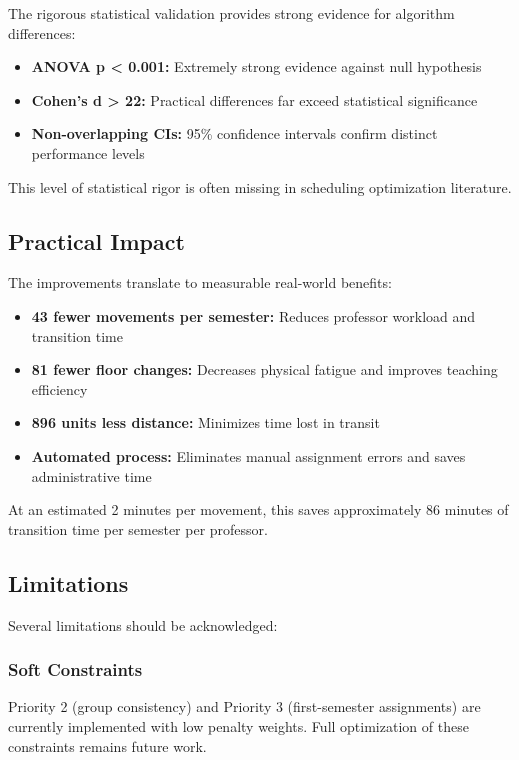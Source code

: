 \documentclass[algorithms,article,submit,pdftex,moreauthors]{Definitions/mdpi}
\begin{document}
The rigorous statistical validation provides strong evidence for algorithm differences:

\begin{itemize}
\item \textbf{ANOVA p < 0.001:} Extremely strong evidence against null hypothesis
\item \textbf{Cohen's d > 22:} Practical differences far exceed statistical significance
\item \textbf{Non-overlapping CIs:} 95\% confidence intervals confirm distinct performance levels
\end{itemize}

This level of statistical rigor is often missing in scheduling optimization literature.

\subsection{Practical Impact}

The improvements translate to measurable real-world benefits:

\begin{itemize}
\item \textbf{43 fewer movements per semester:} Reduces professor workload and transition time
\item \textbf{81 fewer floor changes:} Decreases physical fatigue and improves teaching efficiency
\item \textbf{896 units less distance:} Minimizes time lost in transit
\item \textbf{Automated process:} Eliminates manual assignment errors and saves administrative time
\end{itemize}

At an estimated 2 minutes per movement, this saves approximately 86 minutes of transition time per semester per professor.

\subsection{Limitations}

Several limitations should be acknowledged:

\subsubsection{Soft Constraints}

Priority 2 (group consistency) and Priority 3 (first-semester assignments) are currently implemented with low penalty weights. Full optimization of these constraints remains future work.
\end{document}
